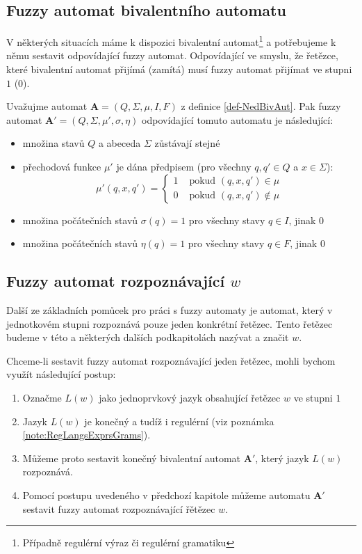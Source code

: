 \documentclass[a4paper,10pt]{article}
\begin{document}
\subsection{Fuzzy automat bivalentního automatu}
V některých situacích máme k dispozici  bivalentní automat\footnote{Případně regulérní výraz či regulérní gramatiku} a potřebujeme k němu sestavit odpovídající fuzzy automat. Odpovídající ve smyslu, že řetězce, které bivalentní automat přijímá (zamítá) musí fuzzy automat přijímat ve stupni $1$ ($0$).

Uvažujme automat $\mathbf{A} = (Q, \Sigma, \mu, I, F)$ z definice \ref{def-NedBivAut}. Pak fuzzy automat $\mathbf{A}' = (Q, \Sigma, \mu', \sigma, \eta)$ odpovídající tomuto automatu je následující:
\begin{itemize}
 \item množina stavů $Q$ a abeceda $\Sigma$ zůstávají stejné
 \item přechodová funkce $\mu'$ je dána předpisem (pro všechny $q, q' \in Q$ a $x \in \Sigma$):
 $$
  \mu'(q, x, q') = 
    \begin{cases}
     1 & \text{ pokud $(q, x, q') \in \mu$} \\
     0 & \text{ pokud $(q, x, q') \notin \mu$}
    \end{cases}
 $$
 \item množina počátečních stavů $\sigma(q) = 1$ pro všechny stavy $q \in I$, jinak $0$
 \item množina počátečních stavů $\eta(q) = 1$ pro všechny stavy $q \in F$, jinak $0$
\end{itemize}

\subsection{Fuzzy automat rozpoznávající $w$} \label{sec:FuzAutRozpOme}
Další ze základních pomůcek pro práci s fuzzy automaty je automat, který v jednotkovém stupni rozpoznává pouze jeden konkrétní řetězec. Tento řetězec budeme v této a některých dalších podkapitolách nazývat  a značit $w$.

Chceme-li sestavit fuzzy automat rozpoznávající jeden řetězec, mohli bychom využít následující postup:
\begin{enumerate} 
 \item Označme $L(w)$ jako jednoprvkový jazyk obsahující řetězec $w$ ve stupni $1$
 \item Jazyk $L(w)$ je konečný a tudíž i regulérní (viz poznámka \ref{note:RegLangsExprsGrams}).
 \item Můžeme proto sestavit konečný bivalentní automat $\mathbf{A}'$, který jazyk $L(w)$ rozpoznává.
 \item Pomocí postupu uvedeného v předchozí kapitole můžeme automatu $\mathbf{A}'$ sestavit fuzzy automat rozpoznávající řětězec $w$.
\end{enumerate}
\end{document}
